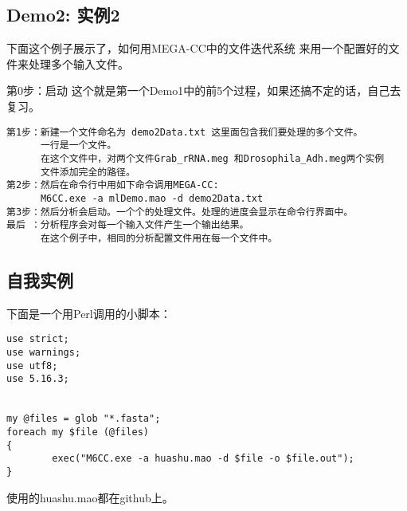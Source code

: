 \documentclass[11pt]{ctexart}
\begin{document}
\subsection{Demo2: 实例2}
\label{sec-3-7}

下面这个例子展示了，如何用MEGA-CC中的文件迭代系统
来用一个配置好的文件来处理多个输入文件。

第0步：启动
这个就是第一个Demo1中的前5个过程，如果还搞不定的话，自己去复习。


\begin{verbatim}
第1步：新建一个文件命名为 demo2Data.txt 这里面包含我们要处理的多个文件。
      一行是一个文件。
      在这个文件中，对两个文件Grab_rRNA.meg 和Drosophila_Adh.meg两个实例
      文件添加完全的路径。
第2步：然后在命令行中用如下命令调用MEGA-CC:
      M6CC.exe -a mlDemo.mao -d demo2Data.txt
第3步：然后分析会启动。一个个的处理文件。处理的进度会显示在命令行界面中。
最后 ：分析程序会对每一个输入文件产生一个输出结果。
      在这个例子中，相同的分析配置文件用在每一个文件中。
\end{verbatim}
\subsection{自我实例}
\label{sec-3-8}

下面是一个用Perl调用的小脚本：

\begin{verbatim}
use strict;
use warnings;
use utf8;
use 5.16.3;


my @files = glob "*.fasta";
foreach my $file (@files)
{
        exec("M6CC.exe -a huashu.mao -d $file -o $file.out");
}
\end{verbatim}
使用的huashu.mao都在github上。
\end{document}

